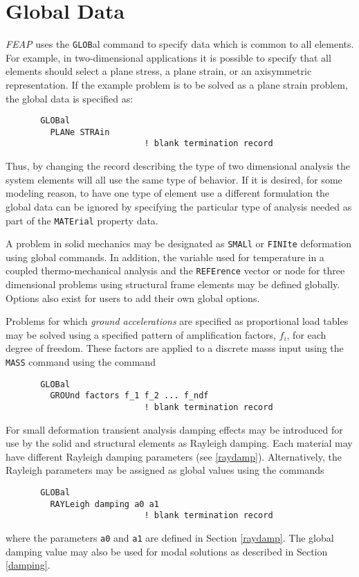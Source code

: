\section{Global Data}
\label{global}

{\sl FEAP} uses the {\tt GLOB}al command to specify data which is common
to all elements.  For
example, in two-dimensional applications it is possible to specify that
all elements should select a plane stress, a plane strain, or an axisymmetric
representation.  If the example problem is to be solved as a plane
strain problem, the global data is specified as:
\begin{verbatim}
       GLOBal
         PLANe STRAin
                            ! blank termination record
\end{verbatim}
\par\noindent
Thus, by changing the record describing the type of two dimensional
analysis the system elements will all use the same type of behavior.  If
it is desired, for some modeling reason, to have one type of element
use a different formulation the global data can be ignored by specifying
the particular type of analysis needed as part of the {\tt MATErial} property
data.

A problem in solid mechanics may be designated as
{\tt SMALl} or {\tt FINIte} deformation using global commands.
In addition, the variable used for temperature in a coupled thermo-mechanical
analysis and the {\tt REFErence} vector or node for three dimensional
problems using structural frame elements may be defined globally.
Options also exist for users to add their own global options.

Problems for which {\it ground accelerations} are specified as proportional
load tables may be solved using a specified pattern of amplification factors,
$f_i$, for each degree of freedom.  These factors are applied to a discrete
masss input using the {\tt MASS} command using the command
\begin{verbatim}
       GLOBal
         GROUnd factors f_1 f_2 ... f_ndf
                            ! blank termination record
\end{verbatim}

For small deformation transient analysis damping effects may be introduced
for use by the solid and structural elements as Rayleigh damping.  Each
material may have different Rayleigh damping parameters (see \ref{raydamp}).
Alternatively, the Rayleigh parameters may be assigned as global values 
using the commands
\begin{verbatim}
       GLOBal
         RAYLeigh damping a0 a1
                            ! blank termination record
\end{verbatim}
\par\noindent
where the parameters {\tt a0} and {\tt a1} are defined in Section \ref{raydamp}.
The global damping value may also be used for modal solutions as described
in Section \ref{damping}.
